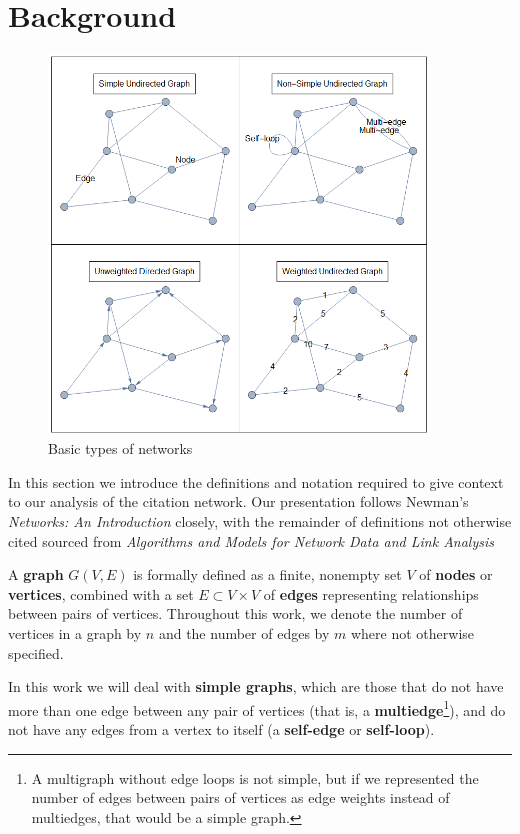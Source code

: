 \documentclass[12pt]{thesis}
\theoremstyle{plain}
\theoremstyle{definition}
\theoremstyle{remark}
\begin{document}
\section{Background}

\begin{figure}[h]
\centering
\includegraphics[width=0.9\textwidth]{basic_properties_demo.png}
\caption{Basic types of networks}
\label{fig:basic_properties_demo}
\end{figure}

In this section we introduce the definitions and notation required to give context to our analysis of the citation network. Our presentation follows Newman's \textit{Networks: An Introduction} \cite{newman2010} closely, with the remainder of definitions not otherwise cited sourced from \textit{Algorithms and Models for Network Data and Link Analysis} \cite{fouss2016}

A \textbf{graph} $G(V,E)$ is formally defined as a finite, nonempty set $V$ of \textbf{nodes} or \textbf{vertices}, combined with a set $E\subset V\times V$ of \textbf{edges} representing relationships between pairs of vertices. Throughout this work, we denote the number of vertices in a graph by $n$ and the number of edges by $m$ where not otherwise specified.

In this work we will deal with \textbf{simple graphs}, which are those that do not have more than one edge between any pair of vertices (that is, a \textbf{multiedge}\footnote{A multigraph without edge loops is not simple, but if we represented the number of edges between pairs of vertices as edge weights instead of multiedges, that would be a simple graph.}), and do not have any edges from a vertex to itself (a \textbf{self-edge} or \textbf{self-loop}). 
\end{document}

